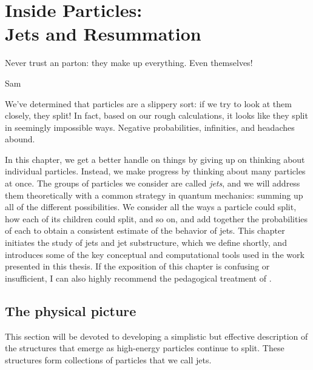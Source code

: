 \chapter[Inside Particles: Jets and Resummation]{Inside Particles:\\Jets and Resummation}
\label{chap:jets}

\epigraph{Never trust an parton: they make up everything. Even themselves!}{Sam}


We've determined that particles are a slippery sort:
%
if we try to look at them closely, they split!
%
In fact, based on our rough calculations, it looks like they split in seemingly impossible ways.
%
Negative probabilities, infinities, and headaches abound.

In this chapter, we get a better handle on things by giving up on thinking about individual particles.
%
Instead, we make progress by thinking about many particles at once.
%
The groups of particles we consider are called \emph{jets}, and we will address them theoretically with a common strategy in quantum mechanics:
%
summing up all of the different possibilities.
%
We consider all the ways a particle could split, how each of its children could split, and so on, and add together the probabilities of each to obtain a consistent estimate of the behavior of jets.
%
This chapter initiates the study of jets and jet substructure, which we define shortly, and introduces some of the key conceptual and computational tools used in the work presented in this thesis.
%
If the exposition of this chapter is confusing or insufficient, I can also highly recommend the pedagogical treatment of .



\section{The physical picture}

This section will be devoted to developing a simplistic but effective description of the structures that emerge as high-energy particles continue to split.
%
These structures form collections of particles that we call jets.

